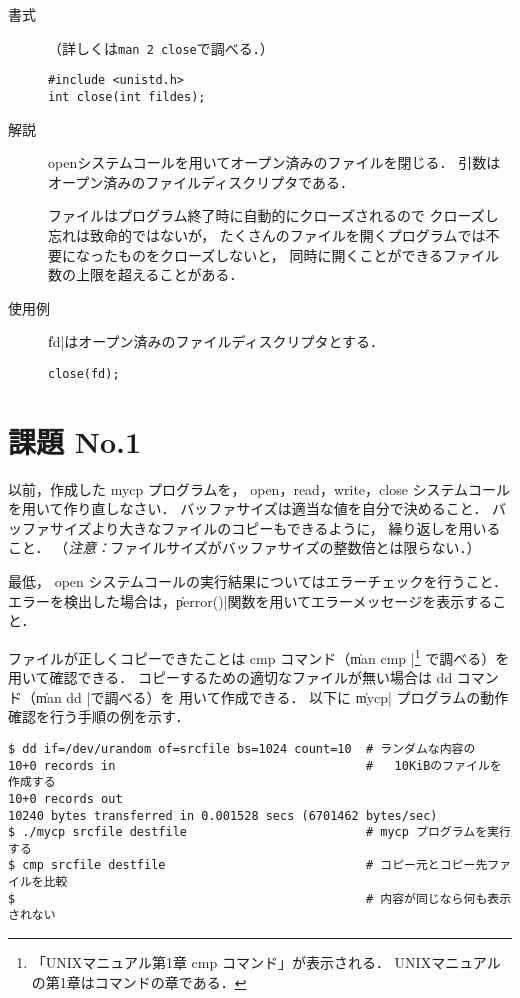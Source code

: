\begin{description}
\item[書式]（詳しくは\texttt{man 2 close}で調べる．）

\begin{lstlisting}[numbers=none]
#include <unistd.h>
int close(int fildes);
\end{lstlisting}

\item[解説]
openシステムコールを用いてオープン済みのファイルを閉じる．
引数はオープン済みのファイルディスクリプタである．

ファイルはプログラム終了時に自動的にクローズされるので
クローズし忘れは致命的ではないが，
たくさんのファイルを開くプログラムでは不要になったものをクローズしないと，
同時に開くことができるファイル数の上限を超えることがある．

\item[使用例]
\|fd|はオープン済みのファイルディスクリプタとする．

\begin{lstlisting}[numbers=none]
close(fd);
\end{lstlisting}
\end{description}

\section*{課題 No.1}
以前，作成した mycp プログラムを，
open，read，write，close システムコールを用いて作り直しなさい．
バッファサイズは適当な値を自分で決めること．
バッファサイズより大きなファイルのコピーもできるように，
繰り返しを用いること．
（\emph{注意：}ファイルサイズがバッファサイズの整数倍とは限らない．）

最低，
open システムコールの実行結果についてはエラーチェックを行うこと．
エラーを検出した場合は，\|perror()|関数を用いてエラーメッセージを表示すること．

ファイルが正しくコピーできたことは cmp コマンド（\| man cmp |\footnote{
「UNIXマニュアル第1章 cmp コマンド」が表示される．
UNIXマニュアルの第1章はコマンドの章である．} で調べる）を
用いて確認できる．
コピーするための適切なファイルが無い場合は dd コマンド（\| man dd |で調べる）を
用いて作成できる．
以下に \|mycp| プログラムの動作確認を行う手順の例を示す．

\begin{lstlisting}[numbers=none]
$ dd if=/dev/urandom of=srcfile bs=1024 count=10  # ランダムな内容の
10+0 records in                                   #   10KiBのファイルを作成する
10+0 records out
10240 bytes transferred in 0.001528 secs (6701462 bytes/sec)
$ ./mycp srcfile destfile                         # mycp プログラムを実行する
$ cmp srcfile destfile                            # コピー元とコピー先ファイルを比較
$                                                 # 内容が同じなら何も表示されない
\end{lstlisting}

